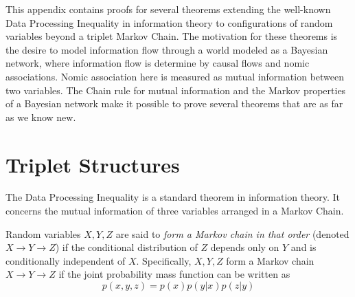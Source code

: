 \documentclass[../thesis.tex]{subfiles}
\begin{document}
This appendix contains proofs for several theorems extending
the well-known Data Processing Inequality in information theory
to configurations of random variables beyond a triplet Markov Chain.
The motivation for these theorems is the desire to model information
flow through a world modeled as a Bayesian network, where information
flow is determine by causal flows and nomic associations.
Nomic association here is measured as mutual information between two variables.
The Chain rule for mutual information and the Markov properties of
a Bayesian network make it possible to prove several theorems that are
as far as we know new.

\section{Triplet Structures}

The Data Processing Inequality is a standard theorem in information theory.
It concerns the mutual information of three variables arranged in a
Markov Chain.

\begin{dfn}
  Random variables $X, Y, Z$ are said to \emph{form a Markov chain in that order}
  (denoted $X \rightarrow Y \rightarrow Z$) if the conditional distribution
  of $Z$ depends only on $Y$ and is conditionally independent of $X$.
  Specifically, $X,Y,Z$ form a Markov chain $X \rightarrow Y \rightarrow Z$
  if the joint probability mass function can be written as
  \begin{equation}
    p(x,y,z) = p(x)p(y \vert x)p(z \vert y)
  \end{equation}
  \cite{cover2012elements}
\end{dfn}
\end{document}
